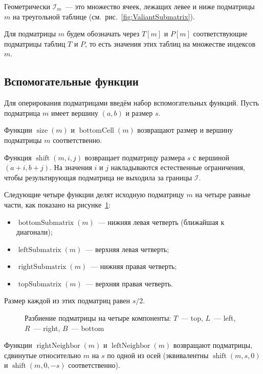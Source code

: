 Геометрически $\mathcal{I}_m$~--- это множество ячеек, лежащих левее и ниже подматрицы $m$ на треугольной таблице (см.~рис.~\ref{fig:ValiantSubmatrix}).

Для подматрицы $m$ будем обозначать через $T[m]$ и $P[m]$ соответствующие подматрицы таблиц $T$ и $P$, то есть значения этих таблиц на множестве индексов $m$.

\subsection{Вспомогательные функции}

Для оперирования подматрицами введём набор вспомогательных функций.
Пусть подматрица $m$ имеет вершину $(a,b)$ и размер $s$.

Функции $\operatorname{size}(m)$ и $\operatorname{bottomCell}(m)$ возвращают размер и вершину подматрицы $m$ соответственно.

Функция $\operatorname{shift}(m, i, j)$ возвращает подматрицу размера $s$ с вершиной $(a+i, b+j)$.
На значения $i$ и $j$ накладываются естественные ограничения, чтобы результирующая подматрица не выходила за границы $\mathcal{I}$.

Следующие четыре функции делят исходную подматрицу $m$ на четыре равные части, как показано на рисунке~\ref{fig:ValiantInner}:
\begin{itemize}
  \item $\operatorname{bottomSubmatrix}(m)$~--- нижняя левая четверть (ближайшая к диагонали);
  \item $\operatorname{leftSubmatrix}(m)$~--- верхняя левая четверть;
  \item $\operatorname{rightSubmatrix}(m)$~--- нижняя правая четверть;
  \item $\operatorname{topSubmatrix}(m)$~--- верхняя правая четверть.
\end{itemize}

Размер каждой из этих подматриц равен $s/2$.

\begin{figure}[h]
  \centering
  \resizebox{0.7\linewidth}{!}{}
  \caption{Разбиение подматрицы на четыре компоненты: $T$~--- top, $L$~--- left, $R$~--- right, $B$~--- bottom}
  \label{fig:ValiantInner}
\end{figure}

Функции $\operatorname{rightNeighbor}(m)$ и $\operatorname{leftNeighbor}(m)$ возвращают подматрицы, сдвинутые относительно $m$ на $s$ по одной из осей (эквивалентны $\operatorname{shift}(m, s, 0)$ и $\operatorname{shift}(m, 0, -s)$ соответственно).

